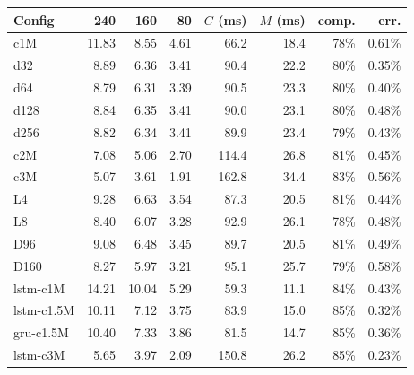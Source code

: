 \begin{tabular}{lrrrrrrr}\hline
Config & 240 & 160 & 80 & $C$ (ms) & $M$ (ms) & comp. & err.\\\hline
c1M & 11.83 & 8.55 & 4.61 & 66.2 & 18.4 & 78\% & 0.61\%\\
d32 & 8.89 & 6.36 & 3.41 & 90.4 & 22.2 & 80\% & 0.35\%\\
d64 & 8.79 & 6.31 & 3.39 & 90.5 & 23.3 & 80\% & 0.40\%\\
d128 & 8.84 & 6.35 & 3.41 & 90.0 & 23.1 & 80\% & 0.48\%\\
d256 & 8.82 & 6.34 & 3.41 & 89.9 & 23.4 & 79\% & 0.43\%\\
c2M & 7.08 & 5.06 & 2.70 & 114.4 & 26.8 & 81\% & 0.45\%\\
c3M & 5.07 & 3.61 & 1.91 & 162.8 & 34.4 & 83\% & 0.56\%\\
L4 & 9.28 & 6.63 & 3.54 & 87.3 & 20.5 & 81\% & 0.44\%\\
L8 & 8.40 & 6.07 & 3.28 & 92.9 & 26.1 & 78\% & 0.48\%\\
D96 & 9.08 & 6.48 & 3.45 & 89.7 & 20.5 & 81\% & 0.49\%\\
D160 & 8.27 & 5.97 & 3.21 & 95.1 & 25.7 & 79\% & 0.58\%\\
lstm-c1M & 14.21 & 10.04 & 5.29 & 59.3 & 11.1 & 84\% & 0.43\%\\
lstm-c1.5M & 10.11 & 7.12 & 3.75 & 83.9 & 15.0 & 85\% & 0.32\%\\
gru-c1.5M & 10.40 & 7.33 & 3.86 & 81.5 & 14.7 & 85\% & 0.36\%\\
lstm-c3M & 5.65 & 3.97 & 2.09 & 150.8 & 26.2 & 85\% & 0.23\%\\
\hline\end{tabular}